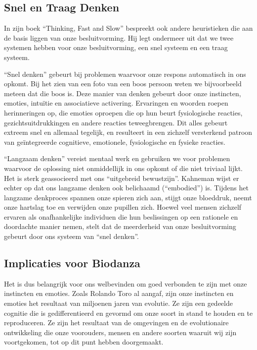 \documentclass[
  11pt,
]{book}
\begin{document}
\hypertarget{snel-en-traag-denken}{%
\subsection{Snel en Traag Denken}\label{snel-en-traag-denken}}

In zijn boek ``Thinking, Fast and Slow'' bespreekt \citet{Kahneman2012} ook andere heuristieken die aan de basis liggen van onze besluitvorming. Hij legt ondermeer uit dat we twee systemen hebben voor onze besluitvorming, een snel systeem en een traag systeem.

``Snel denken'' gebeurt bij problemen waarvoor onze respons automatisch in ons opkomt. Bij het zien van een foto van een boos persoon weten we bijvoorbeeld meteen dat die boos is. Deze manier van denken gebeurt door onze instincten, emoties, intuïtie en associatieve activering. Ervaringen en woorden roepen herinneringen op, die emoties oproepen die op hun beurt fysiologische reacties, gezichtsuitdrukkingen en andere reacties teweegbrengen. Dit alles gebeurt extreem snel en allemaal tegelijk, en resulteert in een zichzelf versterkend patroon van geïntegreerde cognitieve, emotionele, fysiologische en fysieke reacties.

``Langzaam denken'' vereist mentaal werk en gebruiken we voor problemen waarvoor de oplossing niet onmiddellijk in ons opkomt of die niet triviaal lijkt. Het is sterk geassocieerd met ons ``uitgebreid bewustzijn''. Kahneman wijst er echter op dat ons langzame denken ook belichaamd (``embodied'') is. Tijdens het langzame denkproces spannen onze spieren zich aan, stijgt onze bloeddruk, neemt onze hartslag toe en verwijden onze pupillen zich. Hoewel veel mensen zichzelf ervaren als onafhankelijke individuen die hun beslissingen op een rationele en doordachte manier nemen, stelt \citet{Kahneman2012} dat de meerderheid van onze besluitvorming gebeurt door ons systeem van ``snel denken''.

\hypertarget{implicaties-voor-biodanza}{%
\subsection{Implicaties voor Biodanza}\label{implicaties-voor-biodanza}}

Het is dus belangrijk voor ons welbevinden om goed verbonden te zijn met onze instincten en emoties. Zoals Rolando Toro al aangaf, zijn onze instincten en emoties het resultaat van miljoenen jaren van evolutie. Ze zijn een gedeelde cognitie die is gedifferentieerd en gevormd om onze soort in stand te houden en te reproduceren. Ze zijn het resultaat van de omgevingen en de evolutionaire ontwikkeling die onze voorouders, mensen en andere soorten waaruit wij zijn voortgekomen, tot op dit punt hebben doorgemaakt.
\end{document}
